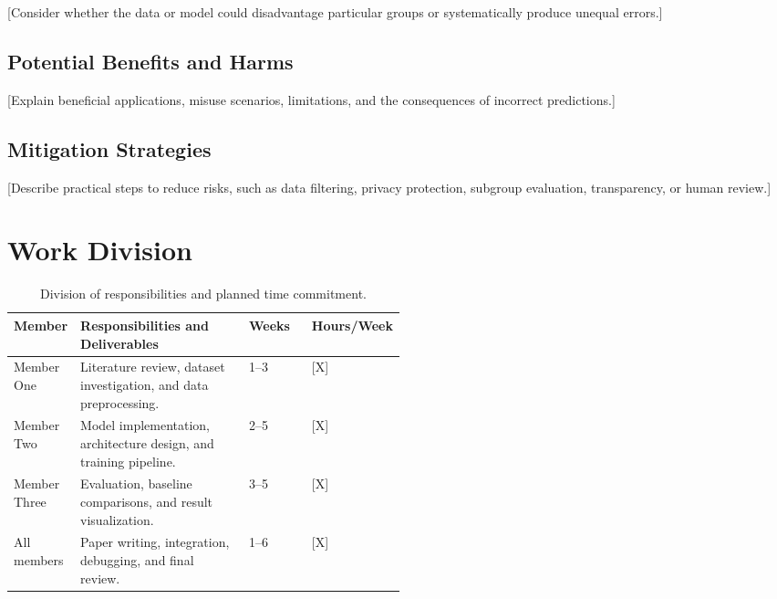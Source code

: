 \documentclass{article}
\begin{document}
[Consider whether the data or model could disadvantage particular
groups or systematically produce unequal errors.]

\subsection{Potential Benefits and Harms}

[Explain beneficial applications, misuse scenarios, limitations,
and the consequences of incorrect predictions.]

\subsection{Mitigation Strategies}

[Describe practical steps to reduce risks, such as data filtering,
privacy protection, subgroup evaluation, transparency, or human review.]

\section{Work Division}


\begin{table}[H]
    \centering
    \small
    \caption{Division of responsibilities and planned time commitment.}
    \label{tab:workdivision}
    \begin{tabularx}{\linewidth}{
        @{}p{0.16\linewidth}
        X
        p{0.16\linewidth}
        p{0.18\linewidth}@{}
    }
        \toprule
        \textbf{Member} &
        \textbf{Responsibilities and Deliverables} &
        \textbf{Weeks} &
        \textbf{Hours/Week} \\
        \midrule
        Member One &
        Literature review, dataset investigation, and data preprocessing. &
        1--3 &
        [X] \\
        \addlinespace
        Member Two &
        Model implementation, architecture design, and training pipeline. &
        2--5 &
        [X] \\
        \addlinespace
        Member Three &
        Evaluation, baseline comparisons, and result visualization. &
        3--5 &
        [X] \\
        \addlinespace
        All members &
        Paper writing, integration, debugging, and final review. &
        1--6 &
        [X] \\
        \bottomrule
    \end{tabularx}
\end{table}
\end{document}
